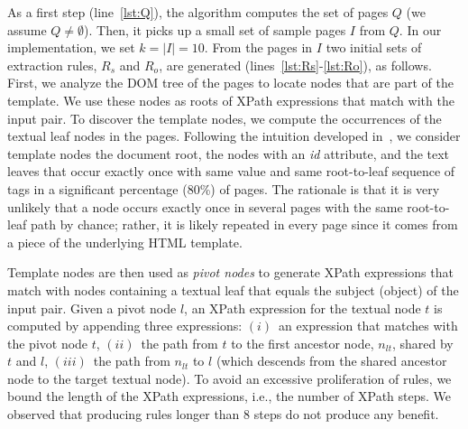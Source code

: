 As a first step (line~\ref{lst:Q}), the algorithm computes the set of pages $Q$
(we assume $Q \neq \emptyset$).
Then, it picks up a small set of sample pages $I$ from $Q$.%
In our implementation, we set $k = |I| = 10$.
%
From the pages in $I$ two initial sets of extraction rules, $R_s$ and $R_o$, are generated (lines~\ref{lst:Rs}-\ref{lst:Ro}), as follows. 
%
%
First, we analyze the DOM tree of the pages to locate nodes that are part 
of the template. We use these nodes as roots of XPath expressions that 
match with the input pair. To discover the template nodes, we compute the occurrences of the textual leaf nodes in the pages. Following the intuition developed in~\cite{exalg}, 
we consider template nodes the document root, the nodes with an {\em id} attribute, 
and  the text leaves that occur exactly once  with same value and same root-to-leaf sequence of tags in a significant 
percentage (80\%) of pages.  The rationale is that it is very unlikely that a node occurs exactly once in several pages with the same root-to-leaf path by chance; rather, it is likely repeated  in every page since it comes from a piece of the underlying HTML template.

Template nodes are then used as {\em pivot nodes} to generate XPath expressions that 
match with nodes containing a textual leaf that equals the subject (object) of the 
input pair. Given a pivot node $l$, an XPath expression for the textual node $t$ 
is computed by appending three expressions: $(i)$~an expression that matches with the
pivot node $t$, $(ii)$~the path from $t$ to the first ancestor node,
$n_{lt}$, shared by $t$ and $l$, $(iii)$~the path from $n_{lt}$ to $l$ 
(which descends from the shared ancestor node to the target textual node).
To avoid an excessive proliferation of rules, we bound the length of
the XPath expressions, i.e., the number of XPath steps.
We observed that producing rules longer than 8 steps do not produce any benefit.

